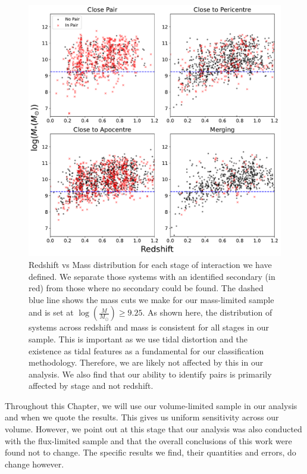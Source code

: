 \begin{figure}
    \centering
    \includegraphics[width=\textwidth]{Chapter3/figures/redshift-limitations.pdf}
    \caption[Redshift vs Mass distribution for each stage of interaction we have defined.]{Redshift vs Mass distribution for each stage of interaction we have defined. We separate those systems with an identified secondary (in red) from those where no secondary could be found. The dashed blue line shows the mass cuts we make for our mass-limited sample and is set at $\log(\frac{M}{M_\odot}) \geq 9.25$. As shown here, the distribution of systems across redshift and mass is consistent for all stages in our sample. This is important as we use tidal distortion and the existence as tidal features as a fundamental for our classification methodology. Therefore, we are likely not affected by this in our analysis. We also find that our ability to identify pairs is primarily affected by stage and not redshift.}
    \label{fig:redshift_selection}
\end{figure}

Throughout this Chapter, we will use our volume-limited sample in our analysis and when we quote the results. This gives us uniform sensitivity across our volume. However, we point out at this stage that our analysis was also conducted with the flux-limited sample and that the overall conclusions of this work were found not to change. The specific results we find, their quantities and errors, do change however. 

